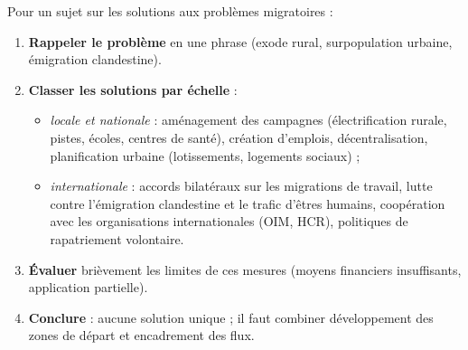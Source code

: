 \documentclass[11pt]{article}
\begin{document}
\begin{methode}
Pour un sujet sur les solutions aux problèmes migratoires :
\begin{enumerate}
\item \textbf{Rappeler le problème} en une phrase (exode rural, surpopulation urbaine, émigration clandestine).
\item \textbf{Classer les solutions par échelle} :
\begin{itemize}
\item \emph{locale et nationale} : aménagement des campagnes (électrification rurale, pistes, écoles, centres de santé), création d'emplois, décentralisation, planification urbaine (lotissements, logements sociaux) ;
\item \emph{internationale} : accords bilatéraux sur les migrations de travail, lutte contre l'émigration clandestine et le trafic d'êtres humains, coopération avec les organisations internationales (OIM, HCR), politiques de rapatriement volontaire.
\end{itemize}
\item \textbf{Évaluer} brièvement les limites de ces mesures (moyens financiers insuffisants, application partielle).
\item \textbf{Conclure} : aucune solution unique ; il faut combiner développement des zones de départ et encadrement des flux.
\end{enumerate}
\end{methode}
\end{document}
